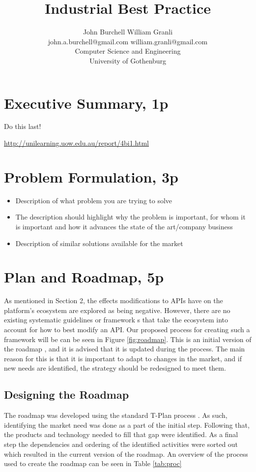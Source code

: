 \documentclass{article}
\title{Industrial Best Practice}
\begin{document}
\author{John Burchell \qquad William Granli \\
		john.a.burchell@gmail.com \qquad william.granli@gmail.com \\
		Computer Science and Engineering  \\
		University of Gothenburg }



\maketitle
\section{Executive Summary, 1p}
Do this last! 

\url{http://unilearning.uow.edu.au/report/4bi1.html}

\section{Problem Formulation, 3p}

\begin{itemize}
	\item Description of what problem you are trying to solve
	\item The description should highlight why the problem is important, for whom it is important and how it advances the state of the art/company business
	\item Description of similar solutions available for the market
\end{itemize}



\section{Plan and Roadmap, 5p}
As mentioned in Section 2, the effects modifications to APIs have on the platform’s ecosystem are explored as being negative. However, there are no existing systematic guidelines or framework s that take the ecosystem into account for how to best modify an API. Our proposed process for creating such a framework will be can be seen in Figure \ref{fig:roadmap}. This is an initial version of the roadmap \cite{!!!roadmap}, and it is advised that it is updated during the process. The main reason for this is that it is important to adapt to changes in the market, and if new needs are identified, the strategy should be redesigned to meet them. 

\subsection{Designing the Roadmap}
The roadmap was developed using the standard T-Plan process \cite{!!!roadmap}. As such, identifying the market need was done as a part of the initial step. Following that, the products and technology needed to fill that gap were identified. As a final step the dependencies and ordering of the identified activities were sorted out which resulted in the current version of the roadmap. An overview of the process used to create the roadmap can be seen in Table \ref{tab:proc}
\end{document}
